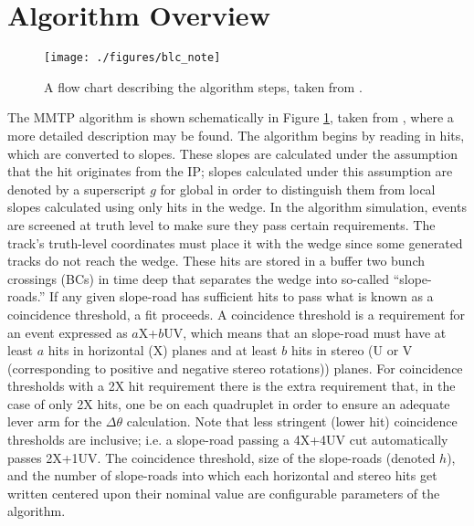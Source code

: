 \section{Algorithm Overview}
\label{sec:algovr}
\begin{figure}[!htbp]\captionsetup{justification=centering}
  \centering
  \texttt{[image: ./figures/blc\_note]}
  \caption{\label{fig:flowchart}A flow chart describing the algorithm steps, taken from \cite{blcnote}.}
\end{figure}
The MMTP algorithm is shown schematically in Figure \ref{fig:flowchart}, taken from \cite{blcnote}, where a more detailed description may be found.  The algorithm begins by reading in hits, which are converted to slopes.  These slopes are calculated under the assumption that the hit originates from the IP; slopes calculated under this assumption are denoted by a superscript $g$ for global in order to distinguish them from local slopes calculated using only hits in the wedge.  In the algorithm simulation, events are screened at truth level to make sure they pass certain requirements.  The track's truth-level coordinates must place it with the wedge since some generated tracks do not reach the wedge.  These hits are stored in a buffer two bunch crossings (BCs) in time deep that separates the wedge into so-called ``slope-roads.''  If any given slope-road has sufficient hits to pass what is known as a coincidence threshold, a fit proceeds.  A coincidence threshold is a requirement for an event expressed as $a$X+$b$UV, which means that an slope-road must have at least $a$ hits in horizontal (X) planes and at least $b$ hits in stereo (U or V (corresponding to positive and negative stereo rotations)) planes.  For coincidence thresholds with a 2X hit requirement there is the extra requirement that, in the case of only 2X hits, one be on each quadruplet in order to ensure an adequate lever arm for the $\Delta\theta$ calculation.  Note that less stringent (lower hit) coincidence thresholds are inclusive; i.e. a slope-road passing a 4X+4UV cut automatically passes 2X+1UV.  The coincidence threshold, size of the slope-roads (denoted $h$), and the number of slope-roads into which each horizontal and stereo hits get written centered upon their nominal value are configurable parameters of the algorithm.

